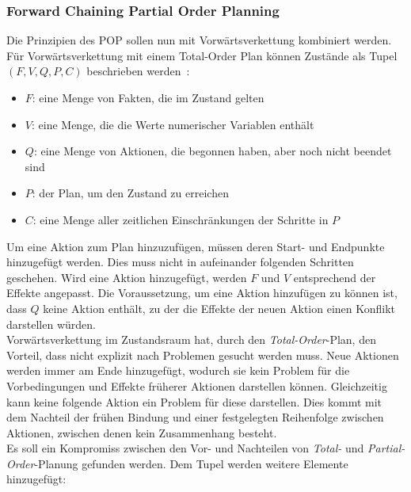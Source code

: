 \subsubsection{Forward Chaining Partial Order Planning}
Die Prinzipien des \ac{POP} sollen nun mit Vorwärtsverkettung kombiniert werden.
Für Vorwärtsverkettung mit einem Total-Order Plan können Zustände als Tupel $(F,V,Q,P,C)$ beschrieben werden~\citep{popf}:
\begin{itemize}
    \item \(F\): eine Menge von Fakten, die im Zustand gelten
    \item \(V\): eine Menge, die die Werte numerischer Variablen enthält
    \item \(Q\): eine Menge von Aktionen, die begonnen haben, aber noch nicht beendet sind
    \item \(P\): der Plan, um den Zustand zu erreichen
    \item \(C\): eine Menge aller zeitlichen Einschränkungen der Schritte in $P$
\end{itemize}
Um eine Aktion zum Plan hinzuzufügen, müssen deren Start- und Endpunkte hinzugefügt werden.
Dies muss nicht in aufeinander folgenden Schritten geschehen.
Wird eine Aktion hinzugefügt, werden $F$ und $V$ entsprechend der Effekte angepasst.
Die Voraussetzung, um eine Aktion hinzufügen zu können ist, dass $Q$ keine Aktion enthält, zu der die Effekte der neuen Aktion einen Konflikt darstellen würden.\\
Vorwärtsverkettung im Zustandsraum hat, durch den \emph{Total-Order}-Plan, den Vorteil, dass nicht explizit nach Problemen gesucht werden muss.
Neue Aktionen werden immer am Ende hinzugefügt, wodurch sie kein Problem für die Vorbedingungen und Effekte früherer Aktionen darstellen können.
Gleichzeitig kann keine folgende Aktion ein Problem für diese darstellen.
Dies kommt mit dem Nachteil der frühen Bindung und einer festgelegten Reihenfolge zwischen Aktionen, zwischen denen kein Zusammenhang besteht.\\
Es soll ein Kompromiss zwischen den Vor- und Nachteilen von \emph{Total-} und \emph{Partial-Order}-Planung gefunden werden.
Dem Tupel werden weitere Elemente hinzugefügt:

